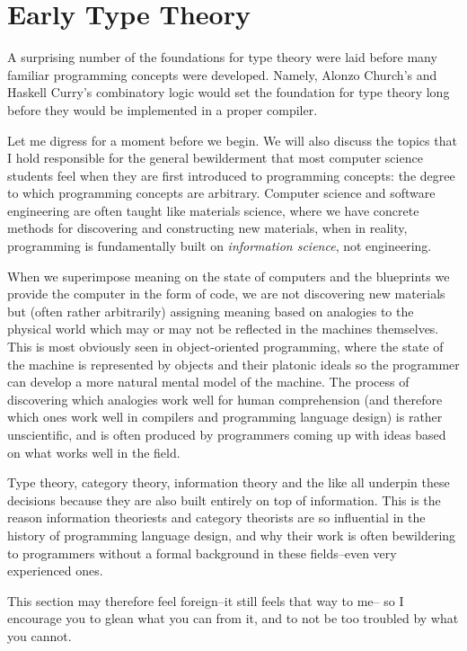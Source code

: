 \section{Early Type Theory}

A surprising number of the foundations for type theory were laid before
many familiar programming concepts were developed.
Namely, Alonzo Church's \lambdacalc{} and Haskell Curry's combinatory logic
would set the foundation for type theory long before they would be implemented in
a proper compiler.

Let me digress for a moment before we begin.
We will also discuss the topics that I hold responsible for the general
bewilderment that most computer science students feel when they are first
introduced to programming concepts: the degree to which programming concepts
are arbitrary.
Computer science and software engineering are often taught like materials science,
where we have concrete methods for discovering and constructing new materials,
when in reality, programming is fundamentally built on \textit{information science},
not engineering.

When we superimpose meaning on the state of computers and the blueprints
we provide the computer in the form of code, we are not discovering new materials
but (often rather arbitrarily) assigning meaning based on analogies to the physical
world which may or may not be reflected in the machines themselves.
This is most obviously seen in object-oriented programming, where the state of
the machine is represented by objects and their platonic ideals so the programmer
can develop a more natural mental model of the machine.
The process of discovering which analogies work well for human comprehension
(and therefore which ones work well in compilers and programming language design)
is rather unscientific, and is often produced by programmers coming up with
ideas based on what works well in the field.

Type theory, category theory, information theory and the like all underpin
these decisions because they are also built entirely on top of information.
This is the reason information theoriests and category theorists are so
influential in the history of programming language design, and why their
work is often bewildering to programmers without a formal background
in these fields--even very experienced ones.

This section may therefore feel foreign--it still feels that way to me--
so I encourage you to glean what you can from it, and to not be too
troubled by what you cannot.

